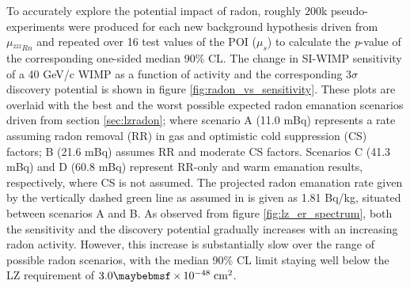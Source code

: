 {To accurately explore the potential impact of radon, roughly $200$k pseudo-experiments were produced for each new background hypothesis driven from $\mu_{^{222}Rn}$ and repeated over 16 test values of the POI ($\mu_{s}$) to calculate the \textit{p}-value of the corresponding one-sided median 90\% CL. The change in SI-WIMP sensitivity of a 40 GeV/c\squared{} WIMP as a function of \RnTTT{} activity and the corresponding $3\sigma$ discovery potential is shown in figure \ref{fig:radon_vs_sensitivity}. These plots are overlaid with the best and the worst possible expected radon emanation scenarios driven from section \ref{sec:lzradon}; where scenario A (11.0 mBq) represents a rate assuming radon removal (RR) in gas and optimistic cold suppression (CS) factors; B (21.6 mBq) assumes RR and moderate CS factors. Scenarios C (41.3 mBq) and D (60.8 mBq) represent RR-only and warm emanation results, respectively, where CS is not assumed. The projected radon emanation rate given by the vertically dashed green line as assumed in \cite{akerib2018projected} is given as 1.81 \micro{}Bq/kg, situated between scenarios A and B. As observed from figure \ref{fig:lz_er_spectrum}, both the sensitivity and the discovery potential gradually increases with an increasing radon activity. However, this increase is substantially slow over the range of possible radon scenarios, with the median 90\% CL limit staying well below the LZ requirement of $3.0 \times 10^{-48} \; \MathText{cm}^2$. 

}
